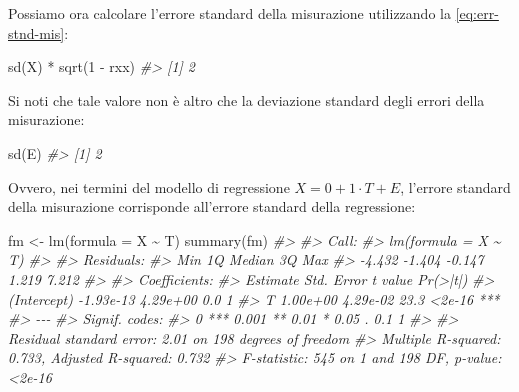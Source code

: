 \documentclass[
  11pt,
]{krantz}
\makeatletter
\newenvironment{Shaded}{\begin{snugshade}}{\end{snugshade}}
\newcommand{\AttributeTok}[1]{\textcolor[rgb]{0.61,0.61,0.61}{#1}}
\newcommand{\CommentTok}[1]{\textcolor[rgb]{0.37,0.37,0.37}{\textit{#1}}}
\newcommand{\DecValTok}[1]{\textcolor[rgb]{0.06,0.06,0.06}{#1}}
\newcommand{\FunctionTok}[1]{\textcolor[rgb]{0,0,0}{#1}}
\newcommand{\NormalTok}[1]{#1}
\newcommand{\OtherTok}[1]{\textcolor[rgb]{0.37,0.37,0.37}{#1}}
\newcommand{\SpecialCharTok}[1]{\textcolor[rgb]{0,0,0}{#1}}
\newenvironment{kframe}{%
\medskip{}
\setlength{\fboxsep}{.8em}
 \def\at@end@of@kframe{}%
 \ifinner\ifhmode%
  \def\at@end@of@kframe{\end{minipage}}%
  \begin{minipage}{\columnwidth}%
 \fi\fi%
 \def\FrameCommand##1{\hskip\@totalleftmargin \hskip-\fboxsep
 \colorbox{shadecolor}{##1}\hskip-\fboxsep
     \hskip-\linewidth \hskip-\@totalleftmargin \hskip\columnwidth}%
 \MakeFramed {\advance\hsize-\width
   \@totalleftmargin\z@ \linewidth\hsize
   \@setminipage}}%
 {\par\unskip\endMakeFramed%
 \at@end@of@kframe}
\renewenvironment{Shaded}{\begin{kframe}}{\end{kframe}}
\theoremstyle{definition}
\theoremstyle{definition}
\theoremstyle{definition}
\theoremstyle{definition}
\theoremstyle{remark}
\makeatother
\begin{document}
Possiamo ora calcolare l'errore standard della misurazione utilizzando la \eqref{eq:err-stnd-mis}:

\begin{Shaded}
\begin{Highlighting}[]
\FunctionTok{sd}\NormalTok{(X) }\SpecialCharTok{*} \FunctionTok{sqrt}\NormalTok{(}\DecValTok{1} \SpecialCharTok{{-}}\NormalTok{ rxx)}
\CommentTok{\#\textgreater{} [1] 2}
\end{Highlighting}
\end{Shaded}

Si noti che tale valore non è altro che la deviazione standard degli errori della misurazione:

\begin{Shaded}
\begin{Highlighting}[]
\FunctionTok{sd}\NormalTok{(E)}
\CommentTok{\#\textgreater{} [1] 2}
\end{Highlighting}
\end{Shaded}

Ovvero, nei termini del modello di regressione \(X = 0 + 1 \cdot T + E\), l'errore standard della misurazione corrisponde all'errore standard della regressione:

\begin{Shaded}
\begin{Highlighting}[]
\NormalTok{fm }\OtherTok{\textless{}{-}} \FunctionTok{lm}\NormalTok{(}\AttributeTok{formula =}\NormalTok{ X }\SpecialCharTok{\textasciitilde{}}\NormalTok{ T)}
\FunctionTok{summary}\NormalTok{(fm)}
\CommentTok{\#\textgreater{} }
\CommentTok{\#\textgreater{} Call:}
\CommentTok{\#\textgreater{} lm(formula = X \textasciitilde{} T)}
\CommentTok{\#\textgreater{} }
\CommentTok{\#\textgreater{} Residuals:}
\CommentTok{\#\textgreater{}    Min     1Q Median     3Q    Max }
\CommentTok{\#\textgreater{} {-}4.432 {-}1.404 {-}0.147  1.219  7.212 }
\CommentTok{\#\textgreater{} }
\CommentTok{\#\textgreater{} Coefficients:}
\CommentTok{\#\textgreater{}              Estimate Std. Error t value Pr(\textgreater{}|t|)    }
\CommentTok{\#\textgreater{} (Intercept) {-}1.93e{-}13   4.29e+00     0.0        1    }
\CommentTok{\#\textgreater{} T            1.00e+00   4.29e{-}02    23.3   \textless{}2e{-}16 ***}
\CommentTok{\#\textgreater{} {-}{-}{-}}
\CommentTok{\#\textgreater{} Signif. codes:  }
\CommentTok{\#\textgreater{} 0 \textquotesingle{}***\textquotesingle{} 0.001 \textquotesingle{}**\textquotesingle{} 0.01 \textquotesingle{}*\textquotesingle{} 0.05 \textquotesingle{}.\textquotesingle{} 0.1 \textquotesingle{} \textquotesingle{} 1}
\CommentTok{\#\textgreater{} }
\CommentTok{\#\textgreater{} Residual standard error: 2.01 on 198 degrees of freedom}
\CommentTok{\#\textgreater{} Multiple R{-}squared:  0.733,  Adjusted R{-}squared:  0.732 }
\CommentTok{\#\textgreater{} F{-}statistic:  545 on 1 and 198 DF,  p{-}value: \textless{}2e{-}16}
\end{Highlighting}
\end{Shaded}
\end{document}

